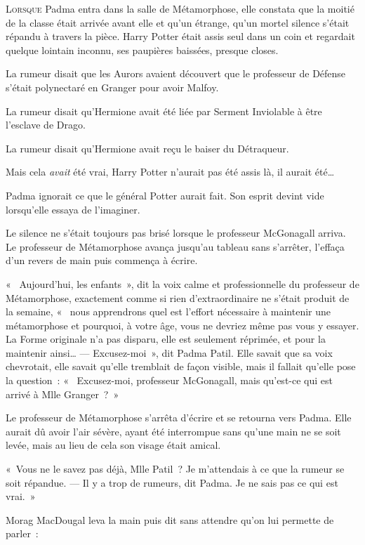 
\lettrine{L}{orsque}  Padma entra dans la salle de Métamorphose, elle constata que la moitié de la classe était arrivée avant elle et qu'un étrange, qu'un mortel silence s'était répandu à travers la pièce. Harry Potter était assis seul dans un coin et regardait quelque lointain inconnu, ses paupières baissées, presque closes.

La rumeur disait que les Aurors avaient découvert que le professeur de Défense s'était polynectaré en Granger pour avoir Malfoy.

La rumeur disait qu'Hermione avait été liée par Serment Inviolable à être l'esclave de Drago.

La rumeur disait qu'Hermione avait reçu le baiser du Détraqueur.

Mais cela \emph{avait} été vrai, Harry Potter n'aurait pas été assis là, il aurait été…

Padma ignorait ce que le général Potter aurait fait. Son esprit devint vide lorsqu'elle essaya de l'imaginer.

Le silence ne s'était toujours pas brisé lorsque le professeur McGonagall arriva. Le professeur de Métamorphose avança jusqu'au tableau sans s'arrêter, l'effaça d'un revers de main puis commença à écrire.

«~ Aujourd'hui, les enfants~», dit la voix calme et professionnelle du professeur de Métamorphose, exactement comme si rien d'extraordinaire ne s'était produit de la semaine, «~ nous apprendrons quel est l'effort nécessaire à maintenir une métamorphose et pourquoi, à votre âge, vous ne devriez même pas vous y essayer. La Forme originale n'a pas disparu, elle est seulement réprimée, et pour la maintenir ainsi…
---  Excusez-moi~», dit Padma Patil. Elle savait que sa voix chevrotait, elle savait qu'elle tremblait de façon visible, mais il fallait qu'elle pose la question~: «~ Excusez-moi, professeur McGonagall, mais qu'est-ce qui est arrivé à Mlle Granger~?~»

Le professeur de Métamorphose s'arrêta d'écrire et se retourna vers Padma. Elle aurait dû avoir l'air sévère, ayant été interrompue sans qu'une main ne se soit levée, mais au lieu de cela son visage était amical.

«~Vous ne le savez pas déjà, Mlle Patil~? Je m'attendais à ce que la rumeur se soit répandue.
---  Il y a trop de rumeurs, dit Padma. Je ne sais pas ce qui est vrai.~»

Morag MacDougal leva la main puis dit sans attendre qu'on lui permette de parler~:

